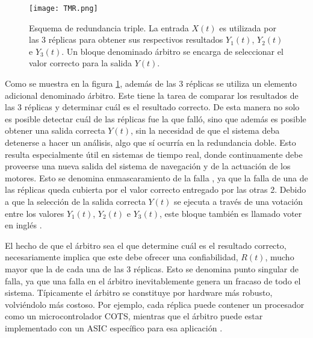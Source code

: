 \begin{figure}[htb]
    \centering
    \texttt{[image: TMR.png]}
    \caption{Esquema de redundancia triple. La entrada $X(t)$ es utilizada por las 3 réplicas para obtener sus respectivos resultados $Y_1(t)$, $Y_2(t)$ e $Y_3(t)$. Un bloque denominado árbitro se encarga de seleccionar el valor correcto para la salida $Y(t)$.}
    \label{fig:TMR}
\end{figure}



Como se muestra en la figura \ref{fig:TMR}, además de las 3 réplicas se utiliza un elemento adicional denominado árbitro. Este tiene la tarea de comparar los resultados de las 3 réplicas y determinar cuál es el resultado correcto. De esta manera no solo es posible detectar cuál de las réplicas fue la que falló, sino que además es posible obtener una salida correcta $Y(t)$, sin la necesidad de que el sistema deba detenerse a hacer un análisis, algo que sí ocurría en la redundancia doble. Esto resulta especialmente útil en sistemas de tiempo real, donde continuamente debe proveerse una nueva salida del sistema de navegación y de la actuación de los motores. Esto se denomina enmascaramiento de la falla \cite{nelson1990fault}, ya que la falla de una de las réplicas queda cubierta por el valor correcto entregado por las otras 2. Debido a que la selección de la salida correcta $Y(t)$ se ejecuta a través de una votación entre los valores $Y_1(t)$, $Y_2(t)$ e $Y_3(t)$, este bloque también es llamado voter en inglés \cite{lyons1962use}.

El hecho de que el árbitro sea el que determine cuál es el resultado correcto, necesariamente implica que este debe ofrecer una confiabilidad, $R(t)$, mucho mayor que la de cada una de las 3 réplicas. Esto se denomina punto singular de falla, ya que una falla en el árbitro inevitablemente genera un fracaso de todo el sistema. Típicamente el árbitro se constituye por hardware más robusto, volviéndolo más costoso. Por ejemplo, cada réplica puede contener un procesador como un microcontrolador COTS, mientras que el árbitro puede estar implementado con un ASIC específico para esa aplicación \cite{hiergeist2017internal}.


